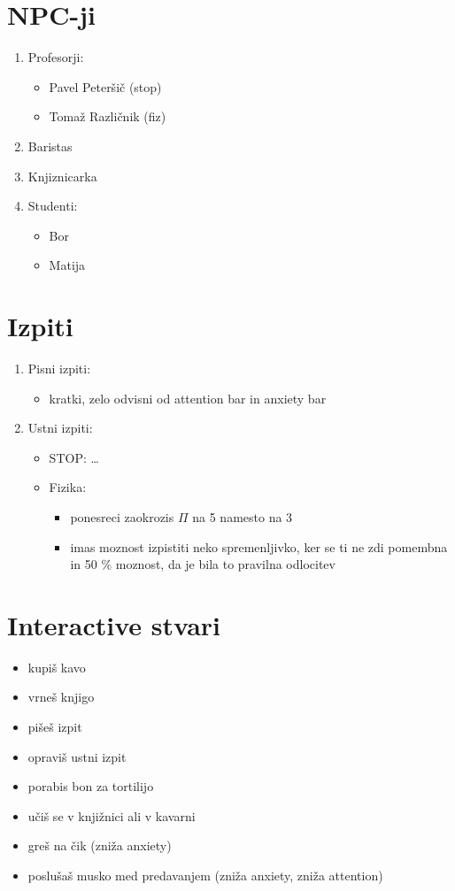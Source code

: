 \documentclass[a4paper]{article}
\begin{document}
\section{NPC-ji}
\begin{enumerate}
    \item Profesorji: \begin{itemize}
        \item Pavel Peteršič (stop)
        \item Tomaž Različnik (fiz)
    \end{itemize}
    \item Baristas
    \item Knjiznicarka
    \item Studenti: \begin{itemize}
        \item Bor
        \item Matija
    \end{itemize}
\end{enumerate}

\section{Izpiti}
\begin{enumerate}
    \item Pisni izpiti: \begin{itemize}
        \item kratki, zelo odvisni od attention bar in anxiety bar
    \end{itemize}

    \item Ustni izpiti: \begin{itemize}
        \item STOP: \ldots
        \item Fizika: \begin{itemize}
            \item ponesreci zaokrozis $\Pi$ na 5 namesto na 3
            \item imas moznost izpistiti neko spremenljivko, ker se ti ne zdi pomembna in 50 \% moznost, da je bila to pravilna odlocitev
        \end{itemize}
    \end{itemize}
\end{enumerate}

\section{Interactive stvari}
\begin{itemize}
    \item kupiš kavo
    \item vrneš knjigo
    \item pišeš izpit
    \item opraviš ustni izpit
    \item porabis bon za tortilijo
    \item učiš se v knjižnici ali v kavarni
    \item greš na čik (zniža anxiety)
    \item poslušaš musko med predavanjem (zniža anxiety, zniža attention)
\end{itemize}
\end{document}
